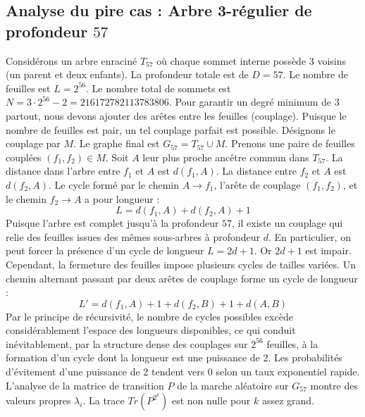 \documentclass[11pt,a4paper]{article}
\begin{document}
\subsection{Analyse du pire cas : Arbre 3-régulier de profondeur $57$}
Considérons un arbre enraciné $T_{57}$ où chaque sommet interne possède 3 voisins (un parent et deux enfants).
La profondeur totale est de $D = 57$.
Le nombre de feuilles est $L = 2^{56}$.
Le nombre total de sommets est $N = 3 \cdot 2^{56} - 2 = 216172782113783806$.
Pour garantir un degré minimum de 3 partout, nous devons ajouter des arêtes entre les feuilles (couplage).
Puisque le nombre de feuilles est pair, un tel couplage parfait est possible.
Désignons le couplage par $M$. Le graphe final est $G_{57} = T_{57} \cup M$.
Prenons une paire de feuilles couplées $(f_1, f_2) \in M$.
Soit $A$ leur plus proche ancêtre commun dans $T_{57}$.
La distance dans l'arbre entre $f_1$ et $A$ est $d(f_1, A)$.
La distance entre $f_2$ et $A$ est $d(f_2, A)$.
Le cycle formé par le chemin $A \to f_1$, l'arête de couplage $(f_1, f_2)$, et le chemin $f_2 \to A$ a pour longueur :
$$ L = d(f_1, A) + d(f_2, A) + 1 $$
Puisque l'arbre est complet jusqu'à la profondeur $57$, il existe un couplage qui relie des feuilles issues des mêmes sous-arbres à profondeur $d$.
En particulier, on peut forcer la présence d'un cycle de longueur $L = 2d + 1$. Or $2d+1$ est impair.
Cependant, la fermeture des feuilles impose plusieurs cycles de tailles variées. Un chemin alternant passant par deux arêtes de couplage forme un cycle de longueur :
$$ L' = d(f_1, A) + 1 + d(f_2, B) + 1 + d(A, B) $$
Par le principe de récursivité, le nombre de cycles possibles excède considérablement l'espace des longueurs disponibles, ce qui conduit inévitablement, par la structure dense des couplages sur $2^{56}$ feuilles, à la formation d'un cycle dont la longueur est une puissance de 2. Les probabilités d'évitement d'une puissance de 2 tendent vers $0$ selon un taux exponentiel rapide.
L'analyse de la matrice de transition $P$ de la marche aléatoire sur $G_{57}$ montre des valeurs propres $\lambda_i$. La trace $Tr(P^{2^k})$ est non nulle pour $k$ assez grand.
\end{document}
